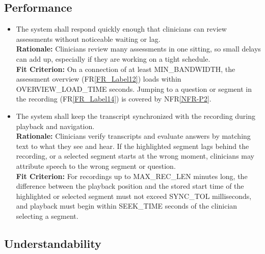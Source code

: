 \documentclass[12pt]{article}
\newcommand{\rref}[1]{FR\ref{#1}}
\newcounter{nfrnum} %
\newcommand{\rthenfrnum}{NFR\thenfrnum}
\newcommand{\nfrref}[1]{NFR\ref{#1}}
\begin{document}
\subsection{Performance}

\noindent \begin{itemize}

\item[\textbf{\rthenfrnum}:]
\label{NFR-PF1}
  The system shall respond quickly enough that clinicians can review assessments without noticeable waiting or lag.
  \\ \textbf{Rationale:} Clinicians review many assessments in one sitting, so small delays can add up, especially if they are working on a tight schedule.
  \\ \textbf{Fit Criterion:} On a connection of at least MIN\_BANDWIDTH, the assessment overview (\rref{FR_Label12}) loads within OVERVIEW\_LOAD\_TIME seconds. Jumping to a question or segment in the recording (\rref{FR_Label14}) is covered by \nfrref{NFR-P2}.

\item[\textbf{\rthenfrnum}:]
\label{NFR-P2}
  The system shall keep the transcript synchronized with the recording during playback and navigation.
  \\ \textbf{Rationale:} Clinicians verify transcripts and evaluate answers by matching text to what they see and hear. If the highlighted segment lags behind the recording, or a selected segment starts at the wrong moment, clinicians may attribute speech to the wrong segment or question.
  \\ \textbf{Fit Criterion:} For recordings up to MAX\_REC\_LEN minutes long, the difference between the playback position and the stored start time of the highlighted or selected segment must not exceed SYNC\_TOL milliseconds, and playback must begin within SEEK\_TIME seconds of the clinician selecting a segment.

\end{itemize}

\subsection{Understandability}
\end{document}
